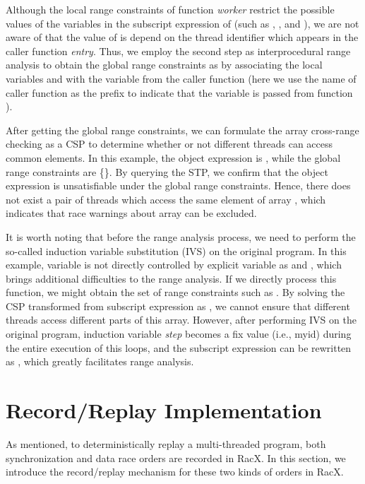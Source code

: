 \documentclass[10pt,onecolumn,letterpaper]{article}
\begin{document}
Although the local range constraints of function \emph{worker}
restrict the possible values of the variables in the subscript
expression of  (such as , , and ), we are not aware
of that the value of  is depend on the thread identifier 
which appears in the caller function \emph{entry}. Thus, we employ
the second step as interprocedural range analysis to obtain the
global range constraints as  by associating the local variables  and
 with the variable  from  the caller function
 (here we use the name of caller function as the prefix to
indicate that the variable is passed from function ).

After getting the global range constraints, we can formulate the
array cross-range checking as a CSP to determine whether or not
different threads can access common elements. In this example, the
object expression is , while the global range constraints are
\{\}. By querying the
STP, we confirm that the object expression is unsatisfiable under
the global range constraints. Hence, there does not exist a pair of
threads which access the same element of array , which indicates
that race warnings about array  can be excluded.

It is worth noting that before the range analysis process, we need
to perform the so-called induction variable substitution (IVS) on
the original program. In this example, variable  is not
directly controlled by explicit variable as  and , which
brings additional difficulties to the range analysis. If we directly
process this function, we might obtain the set of range constraints
such as . By
solving the CSP transformed from subscript expression as , we cannot ensure that different threads access different
parts of this array. However, after performing IVS on the original
program, induction variable \emph{step} becomes a fix value (i.e.,
myid) during the entire execution of this loops, and the subscript
expression can be rewritten as , which greatly
facilitates range analysis.




\section{Record/Replay Implementation}
As mentioned, to deterministically replay a multi-threaded program,
both synchronization and data race orders are recorded in RacX. In
this section, we introduce the record/replay mechanism for these two
kinds of orders in RacX.
\end{document}
